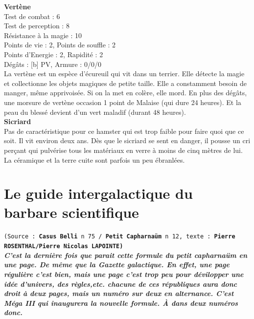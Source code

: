 \documentclass[11pt,twoside,a4paper]{article}
\begin{document}
\begin{multicols}{3}
{{\begin{minipage}[ht]{0.30\textwidth}
\textbf{Vert{\`e}ne}~\\
Test de combat : 6~\\
Test de perception : 8~\\
R{\'e}sistance {\`a} la magie : 10~\\
Points de vie : 2, Points de souffle : 2~\\
Points d'Energie : 2, Rapidit{\'e} : 2~\\
D{\'e}g{\^a}ts : [b] PV, Armure : 0/0/0~\\
La vert{\`e}ne est un esp{\`e}ce d'{\'e}cureuil qui vit dans un terrier. Elle d{\'e}tecte la magie et collectionne les objets magiques de petite taille. Elle a constamment besoin de manger, m{\^e}me apprivois{\'e}e. Si on la met en col{\`e}re, elle mord. En plus des d{\'e}g{\^a}ts, une morsure de vert{\`e}ne occasion 1 point de Malaise (qui dure 24 heures). Et la peau du bless{\'e} devient d'un vert maladif (durant 48 heures).~\\

\textbf{Sicriard}~\\

Pas de caract{\'e}ristique pour ce hamster qui est trop faible pour faire quoi que ce soit. Il vit environ deux ans. D{\`e}s que le sicriard se sent en danger, il pousse un cri per\c{c}ant qui pulv{\'e}rise tous les mat{\'e}riaux en verre {\`a} moins de cinq m{\`e}tres de lui. La c{\'e}ramique et la terre cuite sont parfois un peu {\'e}branl{\'e}es.~\\
\end{minipage} } %

} %
\end{multicols} 

\clearpage

\section{Le guide intergalactique du barbare scientifique}

\texttt{\scriptsize{(Source : \textbf{Casus Belli} n 75 / \textbf{Petit Capharna{\"u}m} n 12, texte : \textbf{Pierre ROSENTHAL/Pierre Nicolas LAPOINTE)} } }~\\ 

\textbf{\textit{\small C'est la derni{\`e}re fois que parait cette formule du petit capharna{\"u}m en une page. De m{\^e}me que la Gazette galactique. En effet, une page r{\'e}guli{\`e}re c'est bien, mais une page c'est trop peu pour d{\'e}vilopper une id{\'e}e d'univers, des r{\`e}gles,etc. chacune de ces r{\'e}publiques aura donc droit {\`a} deux pages, mais un num{\'e}ro sur deux en alternance. C'est M{\'e}ga III qui inaugurera la nouvelle formule. {\`A} dans deux num{\'e}ros donc. }}~\\
\end{document}
